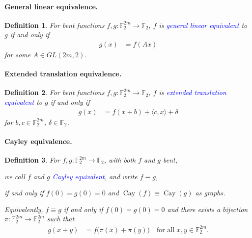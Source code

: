 \documentclass[12pt,a4paper]{article}
\newcommand{\mb}[1]{\mathbb{#1}}
\newcommand{\F}{\mb{F}}
\newcommand{\To}{\rightarrow}
\newcommand{\Emph}[1]{\emph{\textcolor{blue}{#1}}}
\newcommand{\Cay}[1]{\operatorname{Cay}\left(#1\right)}
\newtheorem{Definition}{Definition}
\begin{document}
\paragraph*{General linear equivalence.}

\begin{Definition}
For bent functions $f,g : \F_2^{2m} \To \F_2$,
$f$ is \Emph{general linear equivalent} to $g$ if and only if
\begin{align*}
g(x) &= f(A x)
\end{align*}
for some $A \in GL(2m,2)$.
\end{Definition}

\paragraph*{Extended translation equivalence.}

\begin{Definition}
For bent functions $f,g : \F_2^{2m} \To \F_2$,
$f$ is \Emph{extended translation equivalent} to $g$ if and only if
\begin{align*}
g(x) &= f(x + b) + \langle c, x \rangle + \delta
\end{align*}
for $b, c \in \F_2^{2m}$, $\delta \in \F_2$.
\end{Definition}

\paragraph*{Cayley equivalence.}
\begin{Definition}
%
For $f, g : \F_2^{2m} \To \F_2$, with both $f$ and $g$ bent,

we call $f$ and $g$ \Emph{Cayley equivalent},
and write $f \equiv g$,

if and only if $f(0)=g(0)=0$ and $\Cay{f} \equiv \Cay{g}$ as graphs.

Equivalently, $f \equiv g$ if and only if $f(0)=g(0)=0$ and
there exists a bijection $\pi : \F_2^{2m} \To \F_2^{2m}$ such that
\begin{align*}
g(x+y) &= f \big(\pi(x)+\pi(y)\big) \quad \text{for all~} x,y \in \F_2^{2m}.
\end{align*}
\end{Definition}
\end{document}
